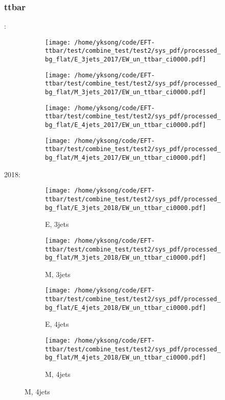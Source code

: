 \documentclass{beamer}
\begin{document}
\begin{frame}
\frametitle{ttbar}
\fontsize{5}{1}:
\begin{figure}
\centering
\begin{subfigure}[b]{0.24\textwidth}
\texttt{[image: /home/yksong/code/EFT-ttbar/test/combine\_test/test2/sys\_pdf/processed\_bg\_flat/E\_3jets\_2017/EW\_un\_ttbar\_ci0000.pdf]}
\end{subfigure}
\begin{subfigure}[b]{0.24\textwidth}
\texttt{[image: /home/yksong/code/EFT-ttbar/test/combine\_test/test2/sys\_pdf/processed\_bg\_flat/M\_3jets\_2017/EW\_un\_ttbar\_ci0000.pdf]}
\end{subfigure}
\begin{subfigure}[b]{0.24\textwidth}
\texttt{[image: /home/yksong/code/EFT-ttbar/test/combine\_test/test2/sys\_pdf/processed\_bg\_flat/E\_4jets\_2017/EW\_un\_ttbar\_ci0000.pdf]}
\end{subfigure}
\begin{subfigure}[b]{0.24\textwidth}
\texttt{[image: /home/yksong/code/EFT-ttbar/test/combine\_test/test2/sys\_pdf/processed\_bg\_flat/M\_4jets\_2017/EW\_un\_ttbar\_ci0000.pdf]}
\end{subfigure}
\end{figure}
2018:
\begin{figure}
\centering
\begin{subfigure}[b]{0.24\textwidth}
\texttt{[image: /home/yksong/code/EFT-ttbar/test/combine\_test/test2/sys\_pdf/processed\_bg\_flat/E\_3jets\_2018/EW\_un\_ttbar\_ci0000.pdf]}
\captionsetup{font=tiny}
\caption{E, 3jets}
\end{subfigure}
\begin{subfigure}[b]{0.24\textwidth}
\texttt{[image: /home/yksong/code/EFT-ttbar/test/combine\_test/test2/sys\_pdf/processed\_bg\_flat/M\_3jets\_2018/EW\_un\_ttbar\_ci0000.pdf]}
\captionsetup{font=tiny}
\caption{M, 3jets}
\end{subfigure}
\begin{subfigure}[b]{0.24\textwidth}
\texttt{[image: /home/yksong/code/EFT-ttbar/test/combine\_test/test2/sys\_pdf/processed\_bg\_flat/E\_4jets\_2018/EW\_un\_ttbar\_ci0000.pdf]}
\captionsetup{font=tiny}
\caption{E, 4jets}
\end{subfigure}
\begin{subfigure}[b]{0.24\textwidth}
\texttt{[image: /home/yksong/code/EFT-ttbar/test/combine\_test/test2/sys\_pdf/processed\_bg\_flat/M\_4jets\_2018/EW\_un\_ttbar\_ci0000.pdf]}
\captionsetup{font=tiny}
\caption{M, 4jets}
\end{subfigure}
\end{figure}
\end{frame}
\end{document}
